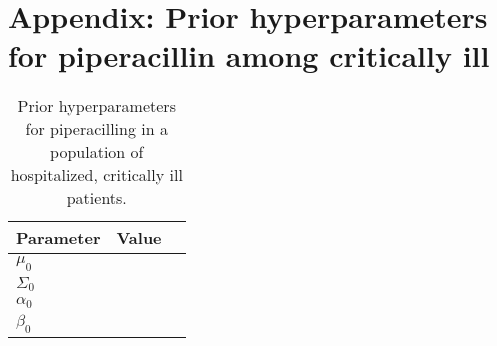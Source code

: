 \documentclass{article}
\begin{document}
\section{Appendix: Prior hyperparameters for piperacillin among critically ill}
\begin{center}
\begin{table}
\begin{tabular}{lll} \hline
Parameter & Value \\ \hline
$\mu_0$ & \\
$\Sigma_0$ & \\
$\alpha_0$ & \\
$\beta_0$  & \\
\hline
\end{tabular}
\caption{Prior hyperparameters for piperacilling in a population of hospitalized, critically ill patients.}\label{tab:hyp}
\end{table}
\end{center}
\end{document}
